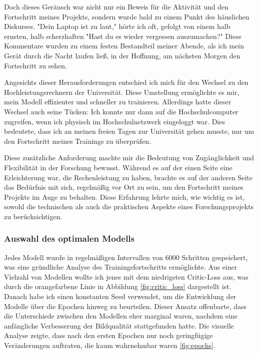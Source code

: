 \documentclass[a4paper, 12pt]{article}
\begin{document}
Doch dieses Geräusch war nicht nur ein Beweis für die Aktivität und den Fortschritt meines Projekts, sondern wurde bald zu einem Punkt des häuslichen Diskurses. "Dein Laptop ist zu laut," hörte ich oft, gefolgt von einem halb ernsten, halb scherzhaften "Hast du es wieder vergessen auszumachen?" Diese Kommentare wurden zu einem festen Bestandteil meiner Abende, als ich mein Gerät durch die Nacht laufen ließ, in der Hoffnung, am nächsten Morgen den Fortschritt zu sehen.

Angesichts dieser Herausforderungen entschied ich mich für den Wechsel zu den Hochleistungsrechnern der Universität. Diese Umstellung ermöglichte es mir, mein Modell effizienter und schneller zu trainieren. Allerdings hatte dieser Wechsel auch seine Tücken: Ich konnte nur dann auf die Hochschulcomputer zugreifen, wenn ich physisch im Hochschulnetzwerk eingeloggt war. Dies bedeutete, dass ich an meinen freien Tagen zur Universität gehen musste, nur um den Fortschritt meines Trainings zu überprüfen.

Diese zusätzliche Anforderung machte mir die Bedeutung von Zugänglichkeit und Flexibilität in der Forschung bewusst. Während es auf der einen Seite eine Erleichterung war, die Rechenleistung zu haben, brachte es auf der anderen Seite das Bedürfnis mit sich, regelmäßig vor Ort zu sein, um den Fortschritt meines Projekts im Auge zu behalten. Diese Erfahrung lehrte mich, wie wichtig es ist, sowohl die technischen als auch die praktischen Aspekte eines Forschungsprojekts zu berücksichtigen.




\subsubsection{Auswahl des optimalen Modells}
Jedes Modell wurde in regelmäßigen Intervallen von 6000 Schritten gespeichert, was eine gründliche Analyse des Trainingsfortschritts ermöglichte. Aus einer Vielzahl von Modellen wollte ich jenes mit dem niedrigsten Critic-Loss aus, was durch die orangefarbene Linie in Abbildung \ref{fig:critic_loss} dargestellt ist. Danach habe ich einen konstanten Seed verwendet, um die Entwicklung der Modelle über die Epochen hinweg zu beurteilen. Dieser Ansatz offenbarte, dass die Unterschiede zwischen den Modellen eher marginal waren, nachdem eine anfängliche Verbesserung der Bildqualität stattgefunden hatte. Die visuelle Analyse zeigte, dass nach den ersten Epochen nur noch geringfügige Veränderungen auftraten, die kaum wahrnehmbar waren \ref{fig:epochs}.
\end{document}
